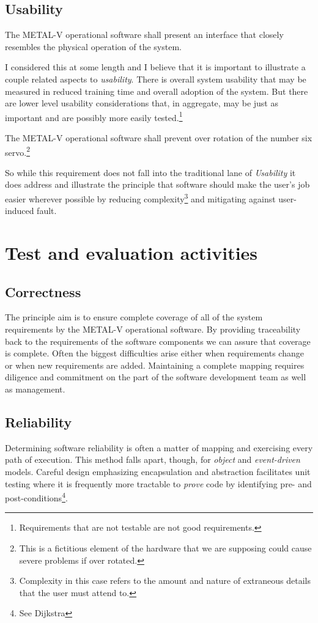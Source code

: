 \documentclass[letterpaper,10pt]{article}
\begin{document}
\subsection{Usability}
The METAL-V operational software shall present an interface that closely resembles the physical operation of the system.
\par
I considered this at some length and I believe that it is important to illustrate a couple related aspects to \emph{usability}.  There is overall system usability that may be measured in reduced training time and overall adoption of the system.  But there are lower level usability considerations that, in aggregate, may be just as important and are possibly more easily tested.\footnote{Requirements that are not testable are not good requirements.}
\par
The METAL-V operational software shall prevent over rotation of the number six servo.\footnote{This is a fictitious element of the hardware that we are supposing could cause severe problems if over rotated.}
\par
So while this requirement does not fall into the traditional lane of \emph{Usability} it does address and illustrate the principle that software should make the user's job easier wherever possible by reducing complexity\footnote{Complexity in this case refers to the amount and nature of extraneous details that the user must attend to.} and mitigating against user-induced fault.

\section{Test and evaluation activities}
\subsection{Correctness}
The principle aim is to ensure complete coverage of all of the system requirements by the METAL-V operational software.  By providing traceability back to the requirements of the software components we can assure that coverage is complete.  Often the biggest difficulties arise either when requirements change or when new requirements are added.  Maintaining a complete mapping requires diligence and commitment on the part of the software development team as well as management.
\subsection{Reliability}
Determining software reliability is often a matter of mapping and exercising every path of execution.  This method falls apart, though, for \emph{object} and \emph{event-driven} models.  Careful design emphasizing encapsulation and abstraction facilitates unit testing where it is frequently more tractable to \emph{prove} code by identifying pre- and post-conditions\footnote{See Dijkstra}.
\end{document}
